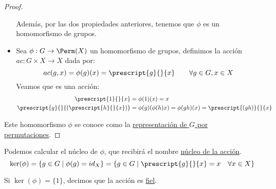 \begin{prop}
\begin{proof}
\begin{itemize}
                \noindent
                Además, por las dos propiedades anteriores, tenemos que $\phi$ es un homomorfismo de grupos.
            \item Sea $\phi:G\to \Perm(X)$ un homomorfismo de grupos, definimos la acción $ac:G\times X \to X$ dada por:
                \begin{equation*}
                    ac(g,x) = \phi(g)(x) = \prescript{g}{}{x} \qquad \forall g\in G, x\in X
                \end{equation*}
                Veamos que es una acción:
                \begin{align*}
                    \prescript{1}{}{x} &= \phi(1)(x) = x \\
                    \prescript{g}{}{(\prescript{h}{}{x})} &= \phi(g)(\phi(h)x) = \phi(gh)(x) = \prescript{(gh)}{}{x}
                \end{align*}
        \end{itemize}
        Este homomorfismo $\phi$ se conoce como la \underline{representación de $G$ por permutaciones}.
    \end{proof}
\end{prop}

Podemos calcular el núcleo de $\phi$, que recibirá el nombre \underline{núcleo de la acción}.
\begin{equation*}
    \ker(\phi) = \{g\in G\mid \phi(g) = id_X\} = \{g\in G \mid \prescript{g}{}{x} = x \quad \forall x\in X\}
\end{equation*}

\begin{definicion}
    Si $\ker(\phi) = \{1\}$, decimos que la acción es \underline{fiel}.
\end{definicion}

